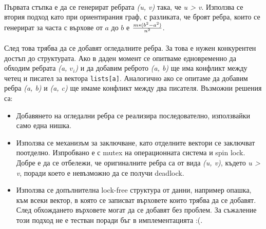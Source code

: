\paragraph*{} Първата стъпка е да се генерират ребрата \textit{(u, v)} така, че \textit{u > v}. Използва се втория подход като при ориентирания граф, с разликата, че броят ребра, които се генерират за часта с върхове от $a$ до $b$ е $m * (b^2 - a^2) \over n^2$.

\paragraph*{} След това трябва да се добавят огледалните ребра. За това е нужен конкурентен достъп до структурата. Ако в даден момент се опитваме едновременно да обходим ребрата \textit{(a, $v_i$)} и да добавим реброто \textit{(a, b)} ще има конфликт между четец и писател за вектора \verb|lists[a]|. Аналогично ако се опитаме да добавим ребра \textit{(a, b)} и \textit{(a, c)} ще имаме конфликт между два писателя. Възможни решения са:

\begin{itemize}
\item Добавянето на огледални ребра се реализира последователно, използвайки само една нишка.
\item Използва се механизъм за заключване, като отделните вектори се заключват поотделно. Изпробвано е с mutex на операционната система и spin lock. Добре е да се отбележи, че оригиналните ребра са от вида \textit{(u, v)}, където \textit{u > v}, поради което е невъзможно да се получи deadlock.
\item Използва се допълнителна lock-free структура от данни, например опашка, към всеки вектор, в която се записват върховете които трябва да се добавят. След обхождането върховете могат да се добавят без проблем. За съжаление този подход не е тестван поради бъг в имплементацията :(.
\end{itemize}
